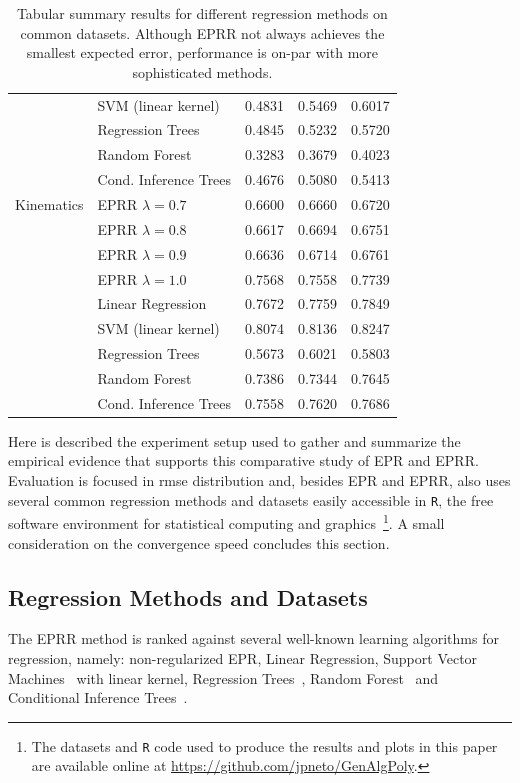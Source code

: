 \documentclass[review,preprint]{elsarticle}
\begin{document}
\begin{table}[t]
\begin{tabular}{ll|ccc}
					 & SVM (linear kernel) 	& 0.4831 & 0.5469 & 0.6017 \\
					 & Regression Trees 	& 0.4845 & 0.5232 & 0.5720 \\
					 & Random Forest 	& 0.3283 & 0.3679 & 0.4023 \\
					 & Cond. Inference Trees 	& 0.4676 & 0.5080 & 0.5413 \\
		\hline
		Kinematics	 & EPRR $\lambda = 0.7$ 	& 0.6600 & 0.6660 & 0.6720 \\
					 & EPRR $\lambda = 0.8$ 	& 0.6617 & 0.6694 & 0.6751 \\
					 & EPRR $\lambda = 0.9$ 	& 0.6636 & 0.6714 & 0.6761 \\
					 & EPRR $\lambda = 1.0$ 	& 0.7568 & 0.7558 & 0.7739 \\
					 & Linear Regression 	& 0.7672 & 0.7759 & 0.7849 \\
					 & SVM (linear kernel) 	& 0.8074 & 0.8136 & 0.8247 \\
					 & Regression Trees 	& 0.5673 & 0.6021 & 0.5803 \\
					 & Random Forest 	& 0.7386 & 0.7344 & 0.7645 \\
					 & Cond. Inference Trees 	& 0.7558 & 0.7620 & 0.7686
	\end{tabular}
	\caption{Tabular summary results for different regression methods on common datasets. Although \ac{EPRR} not always achieves the smallest expected error, performance is on-par with more sophisticated methods.}
\end{table}
Here is described the experiment setup used to gather and summarize the empirical evidence that supports this comparative study of \ac{EPR} and \ac{EPRR}. Evaluation is focused in \ac{rmse} distribution and, besides \ac{EPR} and \ac{EPRR}, also uses several common regression methods and datasets easily accessible in \texttt{R}, the free software environment for statistical computing and graphics~\citep{R-Core-Team:2013aa}\footnote{The datasets and \texttt{R} code used to produce the results and plots in this paper are available online at \url{https://github.com/jpneto/GenAlgPoly}.}. A small consideration on the convergence speed concludes this section.

\subsection{Regression Methods and Datasets}

The \ac{EPRR} method is ranked against several well-known learning algorithms for regression, namely: non-regularized \ac{EPR}, Linear Regression, Support Vector Machines~\citep{Meyer:2012aa} with linear kernel, Regression Trees~\citep{Therneau:2013aa}, Random Forest~\citep{Strobl:2008aa,Strobl:2007aa} and Conditional Inference Trees~\citep{Hothorn:2006aa}.
%
%
\end{document}
